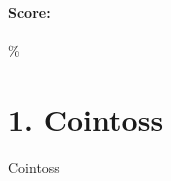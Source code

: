 \documentclass[a4paper,12pt]{book}
\begin{document}
    \paragraph{Score:} \fitb \%
    
    \hrulefill{}
    
    \newpage{}



    \section*{1. Cointoss}

        \begin{intro}{Cointoss}
            
        \end{intro}





        
\end{document}
